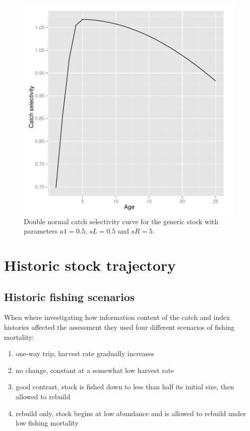 \documentclass[a4paper]{article}
\begin{document}
\begin{figure}
\centering
\includegraphics{script-genericSelectivityPlot}
\caption{Double normal catch selectivity curve for the generic stock with parameters $a1=0.5$, $sL=0.5$ and $sR=5$.}
\label{fig:generic_selectivity}
\end{figure}



\section{Historic stock trajectory}

\subsection{Historic fishing scenarios}

When \cite{Magnusson:2007} where investigating how information content
of the catch and index histories affected the assessment they used four different
scenarios of fishing mortality:

\begin{enumerate}
\item one-way trip, harvest rate gradually increases
\item no change, constant at a somewhat low harvest rate
\item good contrast, stock is fished down to less than half its initial size, then allowed to rebuild
\item rebuild only, stock begins at low abundance and is allowed to rebuild under low fishing mortality
\end{enumerate}
\end{document}
